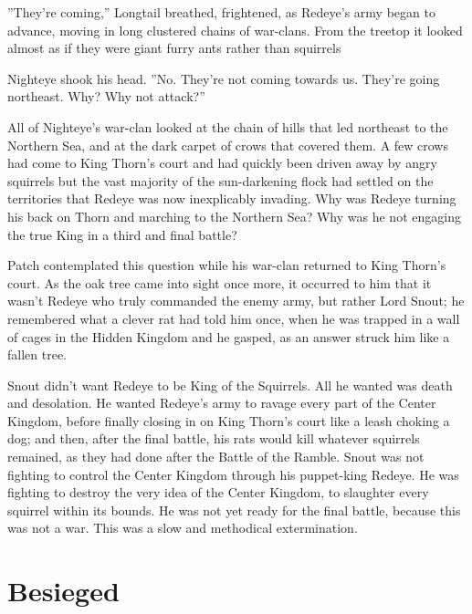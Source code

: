 \documentclass[12pt]{book}
\begin{document}
 ''They're coming,'' Longtail breathed, frightened, as Redeye's army began to advance, moving in long clustered chains of war-clans. From the treetop it looked almost as if they were giant furry ants rather than squirrels\par
 Nighteye shook his head. ''No. They're not coming towards us. They're going northeast. Why? Why not attack?''\par
 All of Nighteye's war-clan looked at the chain of hills that led northeast to the Northern Sea, and at the dark carpet of crows that covered them. A few crows had come to King Thorn's court %
 and had quickly been driven away by angry squirrels %
 but the vast majority of the sun-darkening flock had settled on the territories that Redeye was now inexplicably invading. Why was Redeye turning his back on Thorn and marching to the Northern Sea? Why was he not engaging the true King in a third and final battle?\par
 Patch contemplated this question while his war-clan returned to King Thorn's court. As the oak tree came into sight once more, it occurred to him that it wasn't Redeye who truly commanded the enemy army, but rather Lord Snout; he remembered what a clever rat had told him once, when he was trapped in a wall of cages in the Hidden Kingdom %
 and he gasped, as an answer struck him like a fallen tree.\par
 Snout didn't want Redeye to be King of the Squirrels. All he wanted was death and desolation. He wanted Redeye's army to ravage every part of the Center Kingdom, before finally closing in on King Thorn's court like a leash choking a dog; and then, after the final battle, his rats would kill whatever squirrels remained, as they had done after the Battle of the Ramble. Snout was not fighting to control the Center Kingdom through his puppet-king Redeye. He was fighting to destroy the very idea of the Center Kingdom, to slaughter every squirrel within its bounds. He was not yet ready for the final battle, because this was not a war. This was a slow and methodical extermination.\par

\section{Besieged}
\end{document}
